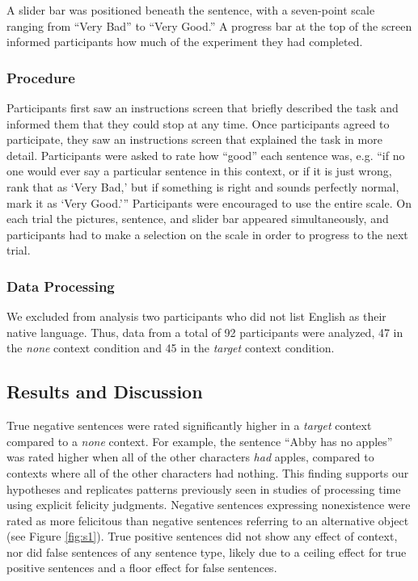 \documentclass[10pt,letterpaper]{article}
\begin{document}
A slider bar was positioned beneath the sentence, with a seven-point scale ranging from ``Very Bad'' to ``Very Good.''  A progress bar at the top of the screen informed participants how much of the experiment they had completed. 

\vspace{.2cm}

\subsubsection{Procedure}

Participants first saw an instructions screen that briefly described the task and informed them that they could stop at any time.  Once participants agreed to participate, they saw an instructions screen that explained the task in more detail.  Participants were asked to rate how ``good'' each sentence was, e.g. ``if no one would ever say a particular sentence in this context, or if it is just wrong, rank that as `Very Bad,' but if something is right and sounds perfectly normal, mark it as `Very Good.''' Participants were encouraged to use the entire scale. On each trial the pictures, sentence, and slider bar appeared simultaneously, and participants had to make a selection on the scale in order to progress to the next trial.  

\vspace{.2cm}

\subsubsection{Data Processing}

We excluded from analysis two participants who did not list English as their native language.  Thus, data from a total of 92 participants were analyzed, 47 in the \emph{none} context condition and 45 in the \emph{target} context condition.  

\subsection{Results and Discussion}

True negative sentences were rated significantly higher in a \emph{target} context compared to a \emph{none} context. For example, the sentence ``Abby has no apples'' was rated higher when all of the other characters \emph{had} apples, compared to contexts where all of the other characters had nothing. This finding supports our hypotheses and replicates patterns previously seen in studies of processing time using explicit felicity judgments.  Negative sentences expressing nonexistence were rated as more felicitous than negative sentences referring to an alternative object (see Figure \ref{fig:s1}). True positive sentences did not show any effect of context, nor did false sentences of any sentence type, likely due to a ceiling effect for true positive sentences and a floor effect for false sentences.  
 
\end{document}
